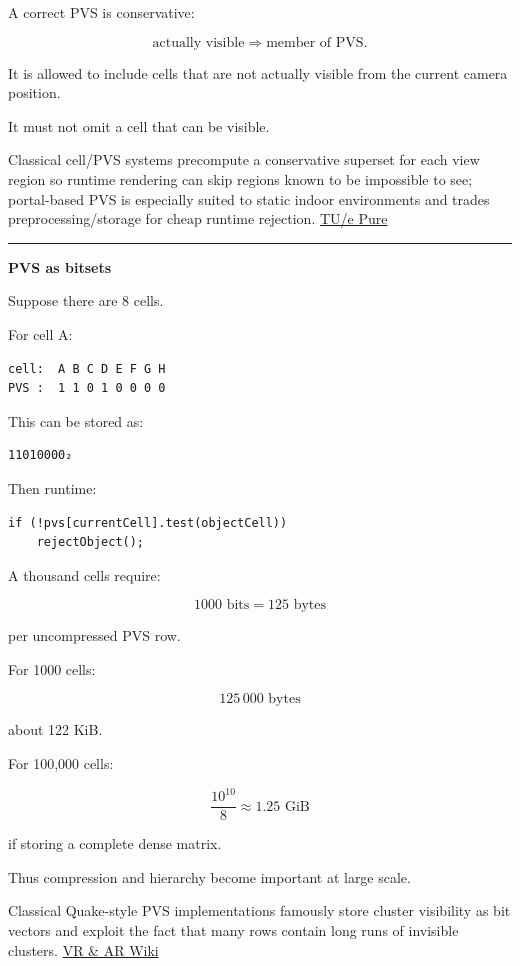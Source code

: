 A correct PVS is conservative:

\[
\text{actually visible}
\Rightarrow
\text{member of PVS}.
\]

It is allowed to include cells that are not actually visible from the current camera position.

It must not omit a cell that can be visible.

Classical cell/PVS systems precompute a conservative superset for each view region so runtime rendering can skip regions known to be impossible to see; portal-based PVS is especially suited to static indoor environments and trades preprocessing/storage for cheap runtime rejection. \href{https://pure.tue.nl/ws/files/46823201/556098-1.pdf?utm_source=chatgpt.com}{TU/e Pure}

\begin{center}\rule{0.5\linewidth}{0.5pt}\end{center}

\textbf{PVS as bitsets}

Suppose there are 8 cells.

For cell A:

\begin{verbatim}
cell:  A B C D E F G H
PVS :  1 1 0 1 0 0 0 0
\end{verbatim}

This can be stored as:

\begin{verbatim}
11010000₂
\end{verbatim}

Then runtime:

\begin{verbatim}
if (!pvs[currentCell].test(objectCell))
    rejectObject();
\end{verbatim}

A thousand cells require:

\[
1000\text{ bits}
=
125\text{ bytes}
\]

per uncompressed PVS row.

For 1000 cells:

\[
125\,000\text{ bytes}
\]

about 122 KiB.

For 100,000 cells:

\[
\frac{10^{10}}8
\approx1.25\text{ GiB}
\]

if storing a complete dense matrix.

Thus compression and hierarchy become important at large scale.

Classical Quake-style PVS implementations famously store cluster visibility as bit vectors and exploit the fact that many rows contain long runs of invisible clusters. \href{https://vrarwiki.com/wiki/Potentially_visible_set?utm_source=chatgpt.com}{VR \& AR Wiki}


